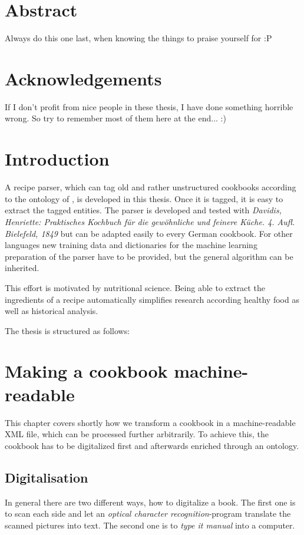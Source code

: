 \documentclass[12pt, twoside]{report}
\begin{document}
\chapter*{Abstract}
Always do this one last, when knowing the things to praise  yourself for :P

\chapter*{Acknowledgements}
If I don't profit from nice people in these thesis, I have done something horrible wrong. So try to remember most of them here at the end... :)

\tableofcontents



\clearpage
{}  
\chapter{Introduction}
A recipe parser, which can tag old and rather unstructured cookbooks according to the ontology of \parencite{schemaRecipe}, is developed in this thesis. Once it is tagged, it is easy to extract the tagged entities. The parser is developed and tested with \textit{Davidis, Henriette: Praktisches Kochbuch für die gewöhnliche und feinere Küche. 4. Aufl. Bielefeld, 1849} but can be adapted easily to every German cookbook. For other languages new training data and dictionaries for the machine learning preparation of the parser have to be provided, but the general algorithm can be inherited.

This effort is motivated by nutritional science. Being able to extract the ingredients of a recipe automatically simplifies research according healthy food as well as historical analysis.

The thesis is structured as follows:


\chapter{Making a cookbook machine-readable}
This chapter covers shortly how we transform a cookbook in a machine-readable XML file, which can be processed further arbitrarily. To achieve this, the cookbook has to be digitalized first and afterwards enriched through an ontology.

\section{Digitalisation}
In general there are two different ways, how to digitalize a book. The first one is to scan each side and let an \textit{optical character recognition}-program translate the scanned pictures into text. The second one is to \textit{type it manual} into a computer.
\end{document}
